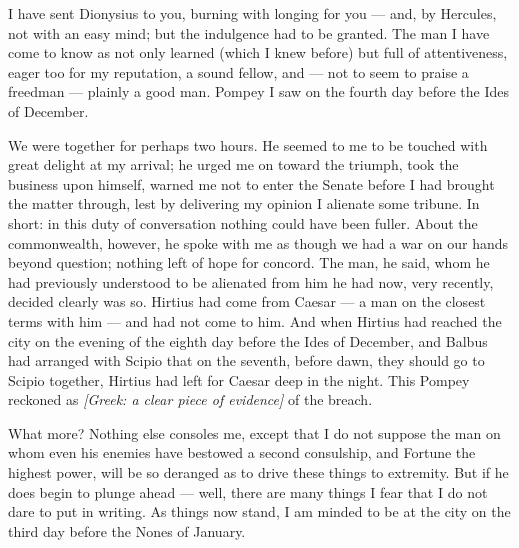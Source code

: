 

 I have sent Dionysius to you, burning with longing for you --- and, by Hercules, not with an easy mind; but the indulgence had to be granted. The man I have come to know as not only learned (which I knew before) but full of attentiveness, eager too for my reputation, a sound fellow, and --- not to seem to praise a freedman --- plainly a good man. Pompey I saw on the fourth day before the Ides of December.

 We were together for perhaps two hours. He seemed to me to be touched with great delight at my arrival; he urged me on toward the triumph, took the business upon himself, warned me not to enter the Senate before I had brought the matter through, lest by delivering my opinion I alienate some tribune. In short: in this duty of conversation nothing could have been fuller. About the commonwealth, however, he spoke with me as though we had a war on our hands beyond question; nothing left of hope for concord. The man, he said, whom he had previously understood to be alienated from him he had now, very recently, decided clearly was so. Hirtius had come from Caesar --- a man on the closest terms with him --- and had not come to him. And when Hirtius had reached the city on the evening of the eighth day before the Ides of December, and Balbus had arranged with Scipio that on the seventh, before dawn, they should go to Scipio together, Hirtius had left for Caesar deep in the night. This Pompey reckoned as \textit{[Greek: a clear piece of evidence]} of the breach.

 What more? Nothing else consoles me, except that I do not suppose the man on whom even his enemies have bestowed a second consulship, and Fortune the highest power, will be so deranged as to drive these things to extremity. But if he does begin to plunge ahead --- well, there are many things I fear that I do not dare to put in writing. As things now stand, I am minded to be at the city on the third day before the Nones of January.
